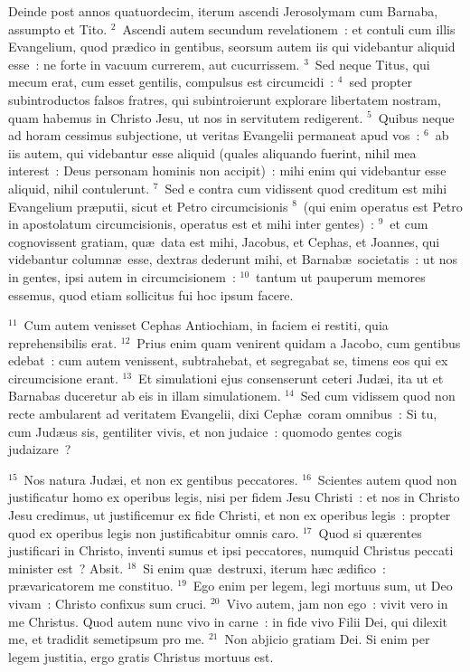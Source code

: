 \bchapter
\lettrine[lines=3,image=true,loversize=0.05,lraise=-0.03]{D}{}einde post annos quatuordecim, iterum ascendi Jerosolymam cum Barnaba, assumpto et Tito.
${}^{2}$~Ascendi autem secundum revelationem~: et contuli cum illis Evangelium, quod pr\ae dico in gentibus, seorsum autem iis qui videbantur aliquid esse~: ne forte in vacuum currerem, aut cucurrissem.
${}^{3}$~Sed neque Titus, qui mecum erat, cum esset gentilis, compulsus est circumcidi~:
${}^{4}$~sed propter subintroductos falsos fratres, qui subintroierunt explorare libertatem nostram, quam habemus in Christo Jesu, ut nos in servitutem redigerent.
${}^{5}$~Quibus neque ad horam cessimus subjectione, ut veritas Evangelii permaneat apud vos~:
${}^{6}$~ab iis autem, qui videbantur esse aliquid (quales aliquando fuerint, nihil mea interest~: Deus personam hominis non accipit)~: mihi enim qui videbantur esse aliquid, nihil contulerunt.
${}^{7}$~Sed e contra cum vidissent quod creditum est mihi Evangelium pr\ae putii, sicut et Petro circumcisionis
${}^{8}$~(qui enim operatus est Petro in apostolatum circumcisionis, operatus est et mihi inter gentes)~:
${}^{9}$~et cum cognovissent gratiam, qu\ae\ data est mihi, Jacobus, et Cephas, et Joannes, qui videbantur column\ae\ esse, dextras dederunt mihi, et Barnab\ae\ societatis~: ut nos in gentes, ipsi autem in circumcisionem~:
${}^{10}$~tantum ut pauperum memores essemus, quod etiam sollicitus fui hoc ipsum facere.


${}^{11}$~Cum autem venisset Cephas Antiochiam, in faciem ei restiti, quia reprehensibilis erat.
${}^{12}$~Prius enim quam venirent quidam a Jacobo, cum gentibus edebat~: cum autem venissent, subtrahebat, et segregabat se, timens eos qui ex circumcisione erant.
${}^{13}$~Et simulationi ejus consenserunt ceteri Jud\ae i, ita ut et Barnabas duceretur ab eis in illam simulationem.
${}^{14}$~Sed cum vidissem quod non recte ambularent ad veritatem Evangelii, dixi Ceph\ae\ coram omnibus~: Si tu, cum Jud\ae us sis, gentiliter vivis, et non judaice~: quomodo gentes cogis judaizare~?


${}^{15}$~Nos natura Jud\ae i, et non ex gentibus peccatores.
${}^{16}$~Scientes autem quod non justificatur homo ex operibus legis, nisi per fidem Jesu Christi~: et nos in Christo Jesu credimus, ut justificemur ex fide Christi, et non ex operibus legis~: propter quod ex operibus legis non justificabitur omnis caro.
${}^{17}$~Quod si qu\ae rentes justificari in Christo, inventi sumus et ipsi peccatores, numquid Christus peccati minister est~? Absit.
${}^{18}$~Si enim qu\ae\ destruxi, iterum h\ae c \ae difico~: pr\ae varicatorem me constituo.
${}^{19}$~Ego enim per legem, legi mortuus sum, ut Deo vivam~: Christo confixus sum cruci.
${}^{20}$~Vivo autem, jam non ego~: vivit vero in me Christus. Quod autem nunc vivo in carne~: in fide vivo Filii Dei, qui dilexit me, et tradidit semetipsum pro me.
${}^{21}$~Non abjicio gratiam Dei. Si enim per legem justitia, ergo gratis Christus mortuus est.


